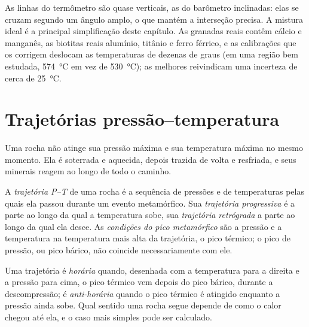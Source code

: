 
As linhas do termômetro são quase verticais, as do barômetro inclinadas: elas se cruzam segundo um
ângulo amplo, o que mantém a interseção precisa. A mistura ideal é a principal simplificação
deste capítulo. As granadas reais contêm cálcio e manganês, as biotitas reais alumínio,
titânio e ferro férrico, e as calibrações que os corrigem deslocam as temperaturas de
dezenas de graus (em uma região bem estudada, \qty{574}{\celsius} em vez de
\qty{530}{\celsius}); as melhores reivindicam uma incerteza de cerca de \qty{25}{\celsius}.

\section{Trajetórias pressão--temperatura}\label{sec:b2:pt-paths:paths}

Uma rocha não atinge sua pressão máxima e sua temperatura máxima no mesmo momento.
Ela é soterrada e aquecida, depois trazida de volta e resfriada, e seus minerais reagem ao longo
de todo o caminho.

\begin{definition}\label{def:b2:pt-paths:paths}
A \emph{trajetória P--T} de uma rocha é a sequência de pressões e de
temperaturas pelas quais ela passou durante um evento metamórfico. Sua \emph{trajetória
progressiva} é a parte ao longo da qual a temperatura sobe, sua \emph{trajetória
retrógrada} a parte ao longo da qual ela desce. As \emph{condições do pico
metamórfico} são a pressão e a temperatura na
temperatura mais alta da trajetória, o pico térmico; o pico de pressão, ou pico bárico, não
coincide necessariamente com ele.
\end{definition}

Uma trajetória é \emph{horária} quando, desenhada com a temperatura para a direita e a pressão para cima,
o pico térmico vem depois do pico bárico, durante a descompressão; é
\emph{anti-horária} quando o pico térmico é atingido enquanto a pressão ainda sobe. Qual
sentido uma rocha segue depende de como o calor chegou até ela, e o caso mais simples pode ser
calculado.

